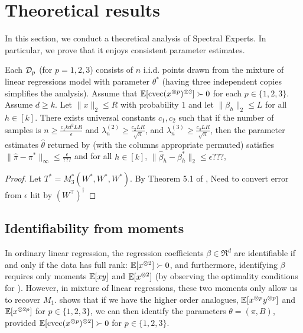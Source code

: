 \section{Theoretical results}



In this section, we conduct a theoretical analysis of Spectral Experts.
In particular, we prove that it enjoys consistent parameter estimates.
\begin{theorem}
  \label{thm:convergence}
Each $\mathcal{D}_p$ (for $p = 1, 2, 3$) consists of $n$ i.i.d. points drawn from the mixture
of linear regressions model with parameter $\theta^*$
(having three independent copies simplifies the analysis).
Assume that $\operatorname{\mathbb{E}}[\operatorname{cvec}(x^{\otimes p})^{\otimes 2}] \succ 0$ for each $p \in \{1,2,3\}$.
Assume $d \ge k$.
Let $\|x\|_2 \le R$ with probability $1$
and let $\|\beta_h\|_2 \le L$ for all $h \in [k]$.
There exists universal constants $c_1,c_2$ such that
if the number of samples is
$n \ge \frac{c_1 k d^2 L R}{\epsilon}$
and $\lambda_n^{(2)} \ge \frac{c_2 L R}{\sqrt{n}}$,
and $\lambda_n^{(3)} \ge \frac{c_3 L R}{\sqrt{n}}$,
then the parameter estimates $\hat\theta$ returned by
 (with the columns appropriate permuted)
satisfies 
$\|\hat\pi - \pi^*\|_{\infty} \le \frac{\epsilon}{???}$
and for all $h \in [k]$,
$\|\hat\beta_h - \beta^*_h\|_2 \le \epsilon ???$,
\end{theorem}
\begin{proof}
Let $T^* = M_3^*(W^*, W^*, W^*)$.
By Theorem 5.1 of \cite{AnandkumarGeHsu2012},
Need to convert error from $\epsilon$
hit by $(W^\top)^\dagger$
\end{proof}


\subsection{Identifiability from moments}

In ordinary linear regression, the regression coefficients $\beta \in \Re^d$ are
identifiable if and only if the data has full
rank: $\operatorname{\mathbb{E}}[x^{\otimes 2}] \succ 0$,
and furthermore, identifying $\beta$ requires only moments
$\operatorname{\mathbb{E}}[xy]$ and $\operatorname{\mathbb{E}}[x^{\otimes 2}]$ (by observing the optimality conditions for ).
However, in mixture of linear regressions, these two moments only allow us to recover $M_1$.
 shows that if we have the higher order analogues,
$\operatorname{\mathbb{E}}[x^{\otimes p}y^{\otimes p}]$ and $\operatorname{\mathbb{E}}[x^{\otimes 2p}]$ for $p \in \{1,2,3\}$,
we can then identify the parameters $\theta = (\pi, B)$,
provided $\operatorname{\mathbb{E}}[\operatorname{cvec}(x^{\otimes p})^{\otimes 2}] \succ 0$ for $p \in \{1,2,3\}$.

